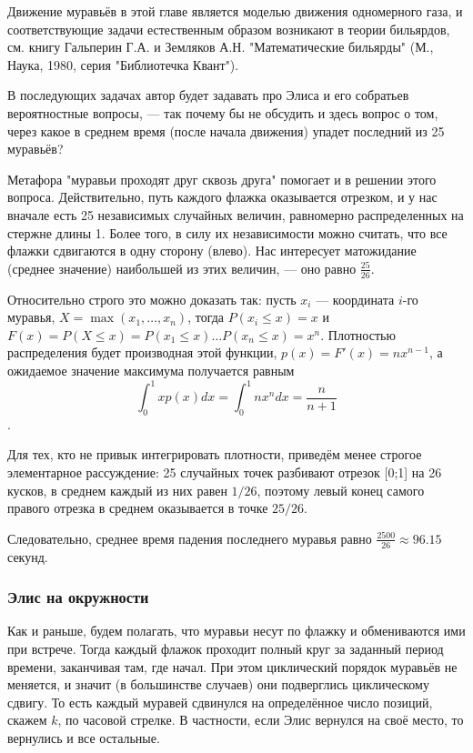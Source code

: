 \begin{addedbytheeditors}
Движение муравьёв в этой главе является моделью движения одномерного газа, и соответствующие задачи естественным образом возникают в теории бильярдов, см. книгу Гальперин Г.А. и Земляков А.Н. 
"Математические бильярды" (М., Наука, 1980, серия "Библиотечка Квант"). 

В последующих задачах автор будет задавать про Элиса и его собратьев вероятностные вопросы, --- так почему бы не обсудить и здесь вопрос о том, через какое в среднем время (после начала движения) упадет последний из 25 муравьёв?  

Метафора "муравьи проходят друг сквозь друга" помогает и в решении этого вопроса. Действительно, путь каждого флажка оказывается отрезком, и у нас вначале есть 25 независимых случайных величин, равномерно распределенных на стержне длины 1.
Более того, в силу их независимости можно считать, что все флажки сдвигаются в одну сторону (влево).
Нас интересует матожидание (среднее значение) наибольшей из этих величин, --- оно равно $\frac{25}{26}$.

Относительно строго это можно доказать так: пусть $x_i$ --- координата $i$-го муравья, $X=\max(x_1, \dots, x_n)$, тогда $P(x_i\le x)=x$ и $F(x)=P(X\le x)=P(x_1\le x)\ldots P(x_n\le x)=x^n$. Плотностью распределения будет производная этой функции, $p(x)=F'(x)=nx^{n-1}$, а ожидаемое значение максимума получается равным $$\int_0^1 x p(x) dx =  \int_0^1 nx^n dx = \frac{n}{n+1}$$. 

Для тех, кто не привык интегрировать плотности, приведём менее строгое элементарное рассуждение: 25 случайных точек разбивают отрезок [0;1] на 26 кусков, в среднем каждый из них равен $1/26$, поэтому левый конец самого правого отрезка в среднем оказывается в точке $25/26$.

Следовательно, среднее время падения последнего муравья равно $\frac{2500}{26} \approx 96.15$ секунд. 
\end{addedbytheeditors}

\subsubsection*{Элис на окружности}

Как и раньше, будем полагать, что муравьи несут по флажку и обмениваются ими при встрече.
Тогда каждый флажок проходит полный круг за заданный период времени, заканчивая там, где начал.
При этом циклический порядок муравьёв не меняется, и значит (в большинстве случаев) они подверглись циклическому сдвигу.
То есть каждый муравей сдвинулся на определённое число позиций, скажем $k$, по часовой стрелке.
В частности, если Элис вернулся на своё место, то вернулись и все остальные.

